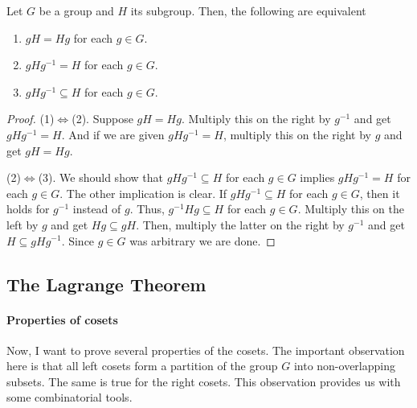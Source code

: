 \begin{claim}
\label{claim::normal_crit}
Let $G$ be a group and $H$ its subgroup.
Then, the following are equivalent
\begin{enumerate}
\item $gH = Hg$ for each $g\in G$.

\item $gHg^{-1} = H$ for each $g\in G$.

\item $gHg^{-1}\subseteq H$ for each $g\in G$.
\end{enumerate}
\end{claim}
\begin{proof}
(1)$\Leftrightarrow$(2).
Suppose $gH = Hg$.
Multiply this on the right by $g^{-1}$ and get $gH g^{-1} = H$.
And if we are given $g H g^{-1} = H$, multiply this on the right by $g$ and get $gH = Hg$.

(2)$\Leftrightarrow$(3).
We should show that $gHg^{-1}\subseteq H$ for each $g\in G$ implies  $gHg^{-1} = H$ for each $g\in G$.
The other implication is clear.
If  $gHg^{-1}\subseteq H$ for each $g\in G$, then it holds for $g^{-1}$ instead of $g$.
Thus, $g^{-1}Hg \subseteq H$ for each $g\in G$.
Multiply this on the left by $g$ and get $Hg \subseteq gH$.
Then, multiply the latter on the right by $g^{-1}$ and get $H \subseteq gH g^{-1}$.
Since $g\in G$ was arbitrary we are done.

\end{proof}

\subsection{The Lagrange Theorem}

\paragraph{Properties of cosets}

Now, I want to prove several properties of the cosets.
The important observation here is that all left cosets form a partition of the group $G$ into non-overlapping subsets.
The same is true for the right cosets.
This observation provides us with some combinatorial tools.


